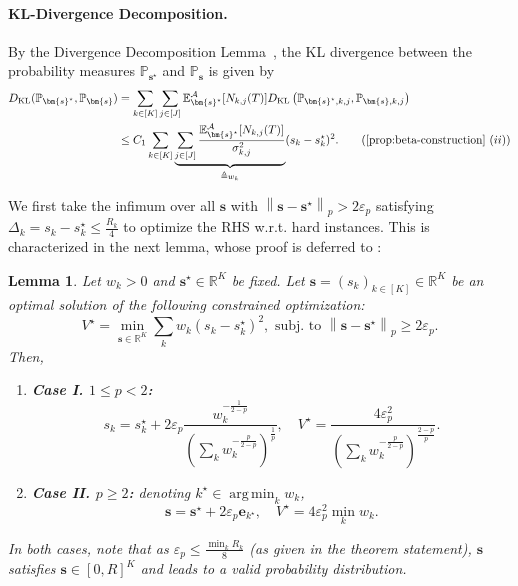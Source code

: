 \documentclass{article}
\def\ve{{\bm{e}}}
\def\vs{{\bm{s}}}
\def\gA{{\mathcal{A}}}
\def\sP{{\mathbb{P}}}
\def\sR{{\mathbb{R}}}
\newcommand{\E}{\mathbb{E}}
\newcommand{\KL}{D_{\mathrm{KL}}}
\DeclareMathOperator*{\argmin}{arg\,min}
\theoremstyle{plain}
\newtheorem{lemma}[theorem]{Lemma}
\theoremstyle{definition}
\theoremstyle{plain}
\newcommand{\bignorm}[1]{\left\lVert #1 \right\rVert}
\begin{document}
\paragraph{KL-Divergence Decomposition.}
By the Divergence Decomposition Lemma~\citep[Lemma 15.1]{banditalgorithms}, the KL divergence between the probability measures $\sP_{\vs^\star}$ and $\sP_{\vs}$ is given by
\begin{align}
    \KL(\sP_{\vs^\star}, \sP_{\vs}) &= \sum_{k \in [K]} \sum_{j \in [J]} \E^\gA_{\vs^\star}[N_{k,j}(T)] \KL\left( \sP_{\vs^\star,k,j}, \sP_{\vs,k,j} \right) \\
    &\leq C_1 \sum_{k \in [K]} \underbrace{\sum_{j \in [J]} \frac{\E^\gA_{\vs^\star}[N_{k,j}(T)]}{\sigma_{k,j}^2}}_{\triangleq w_k} (s_k - s_k^\star)^2. \tag{\Cref{prop:beta-construction} $(ii)$}
\end{align}

We first take the infimum over all $\vs$ with $\bignorm{\vs - \vs^\star}_p > 2 \varepsilon_p$ satisfying $\Delta_k = s_k - s_k^\star \leq \frac{R_k}{4}$ to optimize the RHS w.r.t. hard instances.
This is characterized in the next lemma, whose proof is deferred to :
\begin{lemma}\label{lem:infimum-hard}
    Let $w_k > 0$ and $\vs^\star \in \sR^K$ be fixed. Let $\vs = (s_k)_{k \in [K]} \in \sR^K$ be an optimal solution of the following constrained optimization:
    \begin{equation}
        V^\star = \min_{\vs \in \sR^K} \sum_k w_k (s_k - s_k^\star)^2, \text{ subj. to } \bignorm{\vs - \vs^\star}_p \geq 2 \varepsilon_p.
    \end{equation}
    Then,
    \begin{enumerate}
        \item \textbf{Case I. $1 \leq p < 2$:}
        \begin{equation}
            s_k = s_k^\star + 2\varepsilon_p \frac{w_k^{-\frac{1}{2-p}}}{\left( \sum_k w_k^{-\frac{p}{2-p}} \right)^{\frac{1}{p}}}, \quad V^\star = \frac{4 \varepsilon_p^2}{\left( \sum_k w_k^{-\frac{p}{2-p}} \right)^{\frac{2-p}{p}}}.
        \end{equation}
        \item \textbf{Case II. $p \geq 2$:} denoting $k^\star \in \argmin_k w_k$,
        \begin{equation}
            \vs = \vs^\star + 2 \varepsilon_p \ve_{k^\star}, \quad V^\star = 4 \varepsilon_p^2 \min_k w_k.
        \end{equation}
    \end{enumerate}
    In both cases, note that as $\varepsilon_p \leq \frac{\min_k R_k}{8}$ (as given in the theorem statement), $\vs$ satisfies $\vs \in [0, R]^K$ and leads to a valid probability distribution.
\end{lemma}
\end{document}
